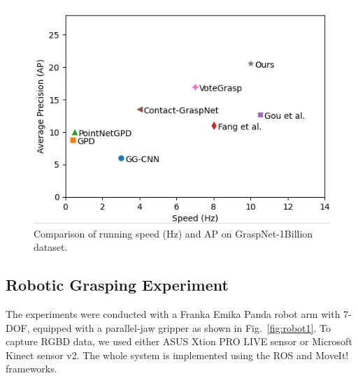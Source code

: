 \begin{figure}
\centering
	\includegraphics[width = 0.98\linewidth]{figs/time}
\caption{Comparison of running speed (Hz) and AP on GraspNet-1Billion
dataset.}
\label{fig:runtime}
\end{figure}

\subsection{Robotic Grasping Experiment}
\label{sec:real_grasping}

The experiments were conducted with a Franka Emika Panda robot arm with 7-DOF, equipped with a parallel-jaw gripper as shown in Fig.~\ref{fig:robot1}. To capture RGBD data, we used either ASUS Xtion PRO LIVE sensor or  Microsoft Kinect sensor v2. The whole system is implemented using the ROS and MoveIt! frameworks. \\

